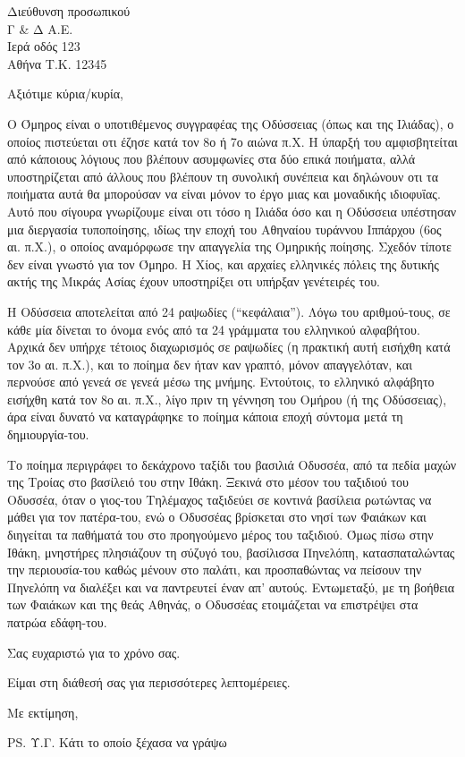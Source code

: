 \documentclass{letter}
\begin{document}
\begin{letter}{Διεύθυνση προσωπικού \\ Γ \& Δ Α.Ε. \\ Ιερά οδός 123
\\ Αθήνα Τ.Κ. 12345}
\opening{Αξιότιμε κύρια/κυρία,}
Ο Όμηρος είναι ο υποτιθέμενος συγγραφέας της Οδύσσειας (όπως και της Ιλιάδας), ο οποίος πιστεύεται οτι έζησε κατά τον 8ο ή 7ο αιώνα π.Χ. Η ύπαρξή του αμφισβητείται από κάποιους λόγιους που βλέπουν ασυμφωνίες στα δύο επικά ποιήματα, αλλά υποστηρίζεται από άλλους που βλέπουν τη συνολική συνέπεια και δηλώνουν οτι τα ποιήματα αυτά θα μπορούσαν να είναι μόνον το έργο μιας και μοναδικής ιδιοφυΐας. Αυτό που σίγουρα γνωρίζουμε είναι οτι τόσο η Ιλιάδα όσο και η Οδύσσεια υπέστησαν μια διεργασία τυποποίησης, ιδίως την εποχή του Αθηναίου τυράννου Ιππάρχου (6ος αι. π.Χ.), ο οποίος αναμόρφωσε την απαγγελία της Ομηρικής ποίησης. Σχεδόν τίποτε δεν είναι γνωστό για τον Όμηρο. Η Χίος, και αρχαίες ελληνικές πόλεις της δυτικής ακτής της Μικράς Ασίας έχουν υποστηρίξει οτι υπήρξαν γενέτειρές του.

Η Οδύσσεια αποτελείται από 24 ραψωδίες (“κεφάλαια”). Λόγω του αριθμού-τους, σε κάθε μία δίνεται το όνομα ενός από τα 24 γράμματα του ελληνικού αλφαβήτου. Αρχικά δεν υπήρχε τέτοιος διαχωρισμός σε ραψωδίες (η πρακτική αυτή εισήχθη κατά τον 3ο αι. π.Χ.), και το ποίημα δεν ήταν καν γραπτό, μόνον απαγγελόταν, και περνούσε από γενεά σε γενεά μέσω της μνήμης. Εντούτοις, το ελληνικό αλφάβητο εισήχθη κατά τον 8ο αι. π.Χ., λίγο πριν τη γέννηση του Ομήρου (ή της Οδύσσειας), άρα είναι δυνατό να καταγράφηκε το ποίημα κάποια εποχή σύντομα μετά τη δημιουργία-του.

Το ποίημα περιγράφει το δεκάχρονο ταξίδι του βασιλιά Οδυσσέα, από τα πεδία μαχών της Τροίας στο βασίλειό του στην Ιθάκη. Ξεκινά στο μέσον του ταξιδιού του Οδυσσέα, όταν ο γιος-του Τηλέμαχος ταξιδεύει σε κοντινά βασίλεια ρωτώντας να μάθει για τον πατέρα-του, ενώ ο Οδυσσέας βρίσκεται στο νησί των Φαιάκων και διηγείται τα παθήματά του στο προηγούμενο μέρος του ταξιδιού. Όμως πίσω στην Ιθάκη, μνηστήρες πλησιάζουν τη σύζυγό του, βασίλισσα Πηνελόπη, κατασπαταλώντας την περιουσία-του καθώς μένουν στο παλάτι, και προσπαθώντας να πείσουν την Πηνελόπη να διαλέξει και να παντρευτεί έναν απ’ αυτούς. Εντωμεταξύ, με τη βοήθεια των Φαιάκων και της θεάς Αθηνάς, ο Οδυσσέας ετοιμάζεται να επιστρέψει στα πατρώα εδάφη-του.
 
Σας ευχαριστώ για το χρόνο σας.
 
Είμαι στη διάθεσή σας για περισσότερες λεπτομέρειες.


 
\closing{Με εκτίμηση,}

\ps{Υ.Γ. Κάτι το οποίο ξέχασα να γράψω\\}
{\color{gray}}
 
\end{letter}
 
\end{document}
